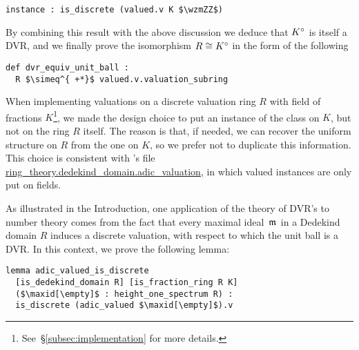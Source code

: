 \documentclass[sigplan,10pt,anonymous,review]{acmart}
\begin{document}
\begin{lstlisting}[caption={The valuation on a DVR is discrete}, label={code:discrete_on_DVR}]
instance : is_discrete (valued.v K $\wzmZZ$)
\end{lstlisting}
By combining this result with the above discussion we deduce that ${K}^\circ$ is itself a DVR, and we finally prove the isomorphism $R\cong{K}^\circ$ in the form of the following\href{https://github.com/LCFT-Lean/local_fields/blob/76ad487d09babdb0018f394a5634526637ee014a/src/discrete_valuation_ring/basic.lean#L518}{\extlink} 
\begin{lstlisting}
def dvr_equiv_unit_ball : 
  R $\simeq^{ +*}$ valued.v.valuation_subring
\end{lstlisting}

\begin{remark}
When implementing valuations on a discrete valuation ring $R$ with field of fractions $K$\footnote{See~\S\ref{subsec:implementation} for more details.}, we made the design choice to put an instance of the  class on $K$, but not on the ring $R$ itself. The reason is that, if needed, we can recover the
uniform structure on $R$ from the one on $K$, so we prefer not to duplicate this information. This choice is consistent with \mathlib's file \url{ring\_theory.dedekind\_domain.adic\_valuation}\href{https://leanprover-community.github.io/mathlib_docs/ring_theory/dedekind_domain/adic_valuation.html}{\extlink}, in which valued instances are only put on fields.
\end{remark}

As illustrated in the Introduction, one application of the theory of DVR's to number theory comes from the fact that every maximal ideal~$\maxid[\empty]$ in a Dedekind domain $R$ induces a discrete valuation, with respect to which the unit ball is a DVR. In this context, we prove the following lemma:\href{https://github.com/LCFT-Lean/local_fields/blob/76ad487d09babdb0018f394a5634526637ee014a/src/discrete_valuation_ring/global_to_local.lean#L23}{\extlink}
\begin{lstlisting}
lemma adic_valued_is_discrete
  [is_dedekind_domain R] [is_fraction_ring R K]
  ($\maxid[\empty]$ : height_one_spectrum R) :
  is_discrete (adic_valued $\maxid[\empty]$).v
\end{lstlisting}

\end{document}
